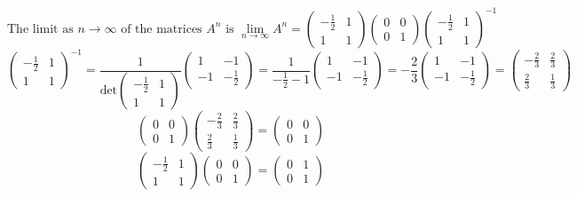 \documentclass[a3paper,12pt]{extarticle} %
\begin{document}
\begin{enumerate}
\begin{enumerate}
\[        \]
        \[
            \text{The limit as } n \to \infty \text{ of the matrices } A^n \text{ is } \lim_{n \to \infty} A^n = \begin{pmatrix} -\frac{1}{2} & 1 \\ 1 & 1 \end{pmatrix} \begin{pmatrix} 0 & 0 \\ 0 & 1 \end{pmatrix} \begin{pmatrix} -\frac{1}{2} & 1 \\ 1 & 1 \end{pmatrix}^{-1}
        \]
        \[
            \begin{pmatrix}
                -\frac{1}{2} & 1 \\
                1 & 1
            \end{pmatrix}^{-1} = \frac{1}{\text{det}\begin{pmatrix} -\frac{1}{2} & 1 \\ 1 & 1 \end{pmatrix}} \begin{pmatrix} 1 & -1 \\ -1 & -\frac{1}{2} \end{pmatrix} = \frac{1}{-\frac{1}{2} - 1} \begin{pmatrix} 1 & -1 \\ -1 & -\frac{1}{2} \end{pmatrix} = -\frac{2}{3} \begin{pmatrix} 1 & -1 \\ -1 & -\frac{1}{2} \end{pmatrix} = \begin{pmatrix} -\frac{2}{3} & \frac{2}{3} \\ \frac{2}{3} & \frac{1}{3} \end{pmatrix}
        \]
        \[
            \begin{pmatrix} 0 & 0 \\ 0 & 1 \end{pmatrix} \begin{pmatrix} -\frac{2}{3} & \frac{2}{3} \\ \frac{2}{3} & \frac{1}{3} \end{pmatrix} =  \begin{pmatrix} 0 & 0 \\ 0 & 1 \end{pmatrix}
        \]
        \[
            \begin{pmatrix} -\frac{1}{2} & 1 \\ 1 & 1 \end{pmatrix} \begin{pmatrix} 0 & 0 \\ 0 & 1 \end{pmatrix} = \begin{pmatrix} 0 & 1 \\ 0 & 1 \end{pmatrix}
\]
\end{enumerate}
\end{enumerate}
\end{document}
